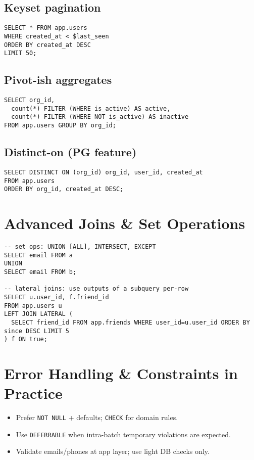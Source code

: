 \documentclass[10pt]{article}
\begin{document}
\subsection{Keyset pagination}
\begin{lstlisting}[style=psql]
SELECT * FROM app.users
WHERE created_at < $last_seen
ORDER BY created_at DESC
LIMIT 50;
\end{lstlisting}

\subsection{Pivot-ish aggregates}
\begin{lstlisting}[style=psql]
SELECT org_id,
  count(*) FILTER (WHERE is_active) AS active,
  count(*) FILTER (WHERE NOT is_active) AS inactive
FROM app.users GROUP BY org_id;
\end{lstlisting}

\subsection{Distinct-on (PG feature)}
\begin{lstlisting}[style=psql]
SELECT DISTINCT ON (org_id) org_id, user_id, created_at
FROM app.users
ORDER BY org_id, created_at DESC;
\end{lstlisting}

\section{Advanced Joins \& Set Operations}
\begin{lstlisting}[style=psql]
-- set ops: UNION [ALL], INTERSECT, EXCEPT
SELECT email FROM a
UNION
SELECT email FROM b;

-- lateral joins: use outputs of a subquery per-row
SELECT u.user_id, f.friend_id
FROM app.users u
LEFT JOIN LATERAL (
  SELECT friend_id FROM app.friends WHERE user_id=u.user_id ORDER BY since DESC LIMIT 5
) f ON true;
\end{lstlisting}

\section{Error Handling \& Constraints in Practice}
\begin{itemize}
  \item Prefer \texttt{NOT NULL} + defaults; \texttt{CHECK} for domain rules.
  \item Use \texttt{DEFERRABLE} when intra-batch temporary violations are expected.
  \item Validate emails/phones at app layer; use light DB checks only.
\end{itemize}
\end{document}
